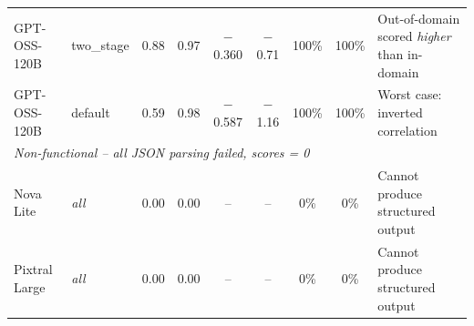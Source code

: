 \begin{table}[ht]
\begin{tabular}{llccccccp{3.8cm}}
GPT-OSS-120B & two\_stage  & 0.88 & 0.97 & $-$0.360 & $-$0.71 & 100\% & 100\% & Out-of-domain scored \emph{higher} than in-domain \\
GPT-OSS-120B & default     & 0.59 & 0.98 & $-$0.587 & $-$1.16 & 100\% & 100\% & Worst case: inverted correlation \\
\midrule
\multicolumn{9}{l}{\textit{Non-functional -- all JSON parsing failed, scores = 0}} \\
\midrule
Nova Lite    & \emph{all}  & 0.00 & 0.00 & -- & -- & 0\% & 0\% & Cannot produce structured output \\
Pixtral Large & \emph{all} & 0.00 & 0.00 & -- & -- & 0\% & 0\% & Cannot produce structured output \\
\bottomrule
\end{tabular}
\end{table}
